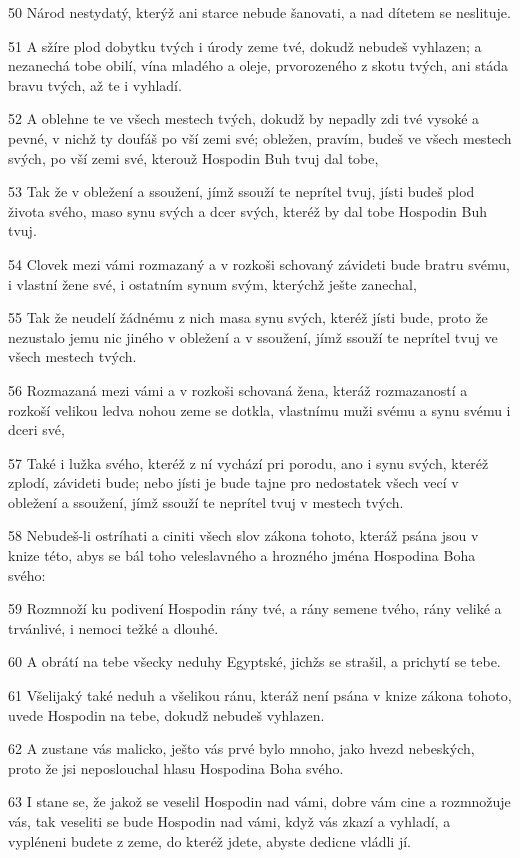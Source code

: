 \par 50 Národ nestydatý, kterýž ani starce nebude šanovati, a nad dítetem se neslituje.
\par 51 A sžíre plod dobytku tvých i úrody zeme tvé, dokudž nebudeš vyhlazen; a nezanechá tobe obilí, vína mladého a oleje, prvorozeného z skotu tvých, ani stáda bravu tvých, až te i vyhladí.
\par 52 A oblehne te ve všech mestech tvých, dokudž by nepadly zdi tvé vysoké a pevné, v nichž ty doufáš po vší zemi své; obležen, pravím, budeš ve všech mestech svých, po vší zemi své, kterouž Hospodin Buh tvuj dal tobe,
\par 53 Tak že v obležení a ssoužení, jímž ssouží te neprítel tvuj, jísti budeš plod života svého, maso synu svých a dcer svých, kteréž by dal tobe Hospodin Buh tvuj.
\par 54 Clovek mezi vámi rozmazaný a v rozkoši schovaný závideti bude bratru svému, i vlastní žene své, i ostatním synum svým, kterýchž ješte zanechal,
\par 55 Tak že neudelí žádnému z nich masa synu svých, kteréž jísti bude, proto že nezustalo jemu nic jiného v obležení a v ssoužení, jímž ssouží te neprítel tvuj ve všech mestech tvých.
\par 56 Rozmazaná mezi vámi a v rozkoši schovaná žena, kteráž rozmazaností a rozkoší velikou ledva nohou zeme se dotkla, vlastnímu muži svému a synu svému i dceri své,
\par 57 Také i lužka svého, kteréž z ní vychází pri porodu, ano i synu svých, kteréž zplodí, závideti bude; nebo jísti je bude tajne pro nedostatek všech vecí v obležení a ssoužení, jímž ssouží te neprítel tvuj v mestech tvých.
\par 58 Nebudeš-li ostríhati a ciniti všech slov zákona tohoto, kteráž psána jsou v knize této, abys se bál toho veleslavného a hrozného jména Hospodina Boha svého:
\par 59 Rozmnoží ku podivení Hospodin rány tvé, a rány semene tvého, rány veliké a trvánlivé, i nemoci težké a dlouhé.
\par 60 A obrátí na tebe všecky neduhy Egyptské, jichžs se strašil, a prichytí se tebe.
\par 61 Všelijaký také neduh a všelikou ránu, kteráž není psána v knize zákona tohoto, uvede Hospodin na tebe, dokudž nebudeš vyhlazen.
\par 62 A zustane vás malicko, ješto vás prvé bylo mnoho, jako hvezd nebeských, proto že jsi neposlouchal hlasu Hospodina Boha svého.
\par 63 I stane se, že jakož se veselil Hospodin nad vámi, dobre vám cine a rozmnožuje vás, tak veseliti se bude Hospodin nad vámi, když vás zkazí a vyhladí, a vypléneni budete z zeme, do kteréž jdete, abyste dedicne vládli jí.
